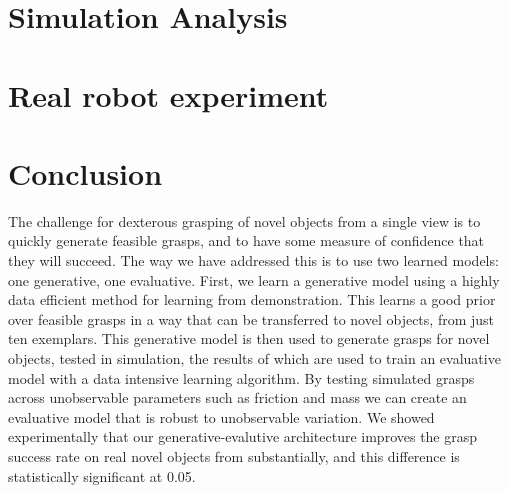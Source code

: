 \documentclass[conference]{IEEEtrans}
\begin{document}
\section{Simulation Analysis}
\label{section:simulationAnalysis}


\section{Real robot experiment}
\label{section:experiments}


\section{Conclusion} 
\label{sec:conclusion}

The challenge for dexterous grasping of novel objects from a single view is to quickly generate feasible grasps, and to have some measure of confidence that they will succeed. The way we have addressed this is to use two learned models: one generative, one evaluative. First, we learn a generative model using a highly data efficient method for learning from demonstration. This learns a good prior over feasible grasps in a way that can be transferred to novel objects, from just ten exemplars. This generative model is then used to generate grasps for novel objects, tested in simulation, the results of which are used to train an evaluative model with a data intensive learning algorithm. By testing simulated grasps across unobservable parameters such as friction and mass we can create an evaluative model that is robust to unobservable variation. We showed experimentally that our generative-evalutive architecture  improves the grasp success rate on real novel objects from substantially, and this difference is statistically significant at 0.05. 


\end{document}
